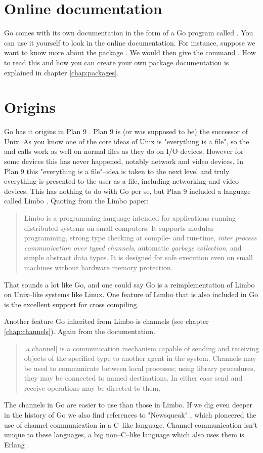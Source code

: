 \section{Online documentation}
Go comes with its own documentation in the form of a Go program called
. 
You can use it yourself to look
in the online documentation. For
instance, suppose we want to know more about the package .
We would then give the command .
How to read this and how you can create your own package documentation
is explained in chapter \ref{chap:packages}.

\section{Origins}
Go has it origins in Plan 9 \cite{plan9}. Plan 9 is (or was 
supposed to be) the successor of Unix. As you know one of the
core ideas of Unix is "everything is a file", so the  and
 calls work as well on normal files as they do on I/O
devices. However for some devices this has never happened, notably
network and video devices. In Plan 9 this "everything is a file"--idea
is taken to the next level and truly everything is presented to the 
user as a file, including networking and video devices. This has nothing
to do with Go per se, but Plan 9 included a language called Limbo
\cite{limbo}. Quoting from the Limbo paper:
\begin{quote}
Limbo is a programming language intended for applications running
distributed systems on small computers. It supports modular programming,
strong type checking at compile- and run-time, \emph{inter process
communication over typed channels}, automatic \emph{garbage collection}, and
simple abstract data types. It is designed for safe execution even on
small machines without hardware memory protection.
\end{quote}
That sounds a lot like Go, and one could say Go is a reimplementation of
Limbo on Unix--like systems like Linux. One feature of Limbo that is
also included in Go is the excellent support for cross compiling.

Another feature Go inherited from Limbo is channels (see chapter
\ref{chap:channels}). Again from the documentation.
\begin{quote}
[a channel] is a communication mechanism capable of sending and receiving objects of
the specified type to another agent in the system. Channels may be used
to communicate between local processes; using library procedures, they
may be connected to named destinations. In either case send and receive
operations may be directed to them.
\end{quote}
The channels in Go are easier to use than those in Limbo.
If we dig even deeper in the history of Go we also find references
to "Newsqueak" \cite{newsqueak}, which pioneered the use of 
channel communication in a C--like language. Channel
communication isn't unique to these languages, a big non--C--like
language which also uses them is Erlang \cite{erlang}.

